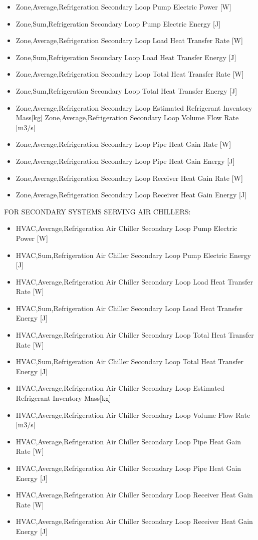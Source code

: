 \begin{itemize}
\item
  Zone,Average,Refrigeration Secondary Loop Pump Electric Power {[}W{]}
\item
  Zone,Sum,Refrigeration Secondary Loop Pump Electric Energy {[}J{]}
\item
  Zone,Average,Refrigeration Secondary Loop Load Heat Transfer Rate {[}W{]}
\item
  Zone,Sum,Refrigeration Secondary Loop Load Heat Transfer Energy {[}J{]}
\item
  Zone,Average,Refrigeration Secondary Loop Total Heat Transfer Rate {[}W{]}
\item
  Zone,Sum,Refrigeration Secondary Loop Total Heat Transfer Energy {[}J{]}
\item
  Zone,Average,Refrigeration Secondary Loop Estimated Refrigerant Inventory Mass{[}kg{]} Zone,Average,Refrigeration Secondary Loop Volume Flow Rate {[}m3/s{]}
\item
  Zone,Average,Refrigeration Secondary Loop Pipe Heat Gain Rate {[}W{]}
\item
  Zone,Average,Refrigeration Secondary Loop Pipe Heat Gain Energy {[}J{]}
\item
  Zone,Average,Refrigeration Secondary Loop Receiver Heat Gain Rate {[}W{]}
\item
  Zone,Average,Refrigeration Secondary Loop Receiver Heat Gain Energy {[}J{]}
\end{itemize}

FOR SECONDARY SYSTEMS SERVING AIR CHILLERS:

\begin{itemize}
\item
  HVAC,Average,Refrigeration Air Chiller Secondary Loop Pump Electric Power {[}W{]}
\item
  HVAC,Sum,Refrigeration Air Chiller Secondary Loop Pump Electric Energy {[}J{]}
\item
  HVAC,Average,Refrigeration Air Chiller Secondary Loop Load Heat Transfer Rate {[}W{]}
\item
  HVAC,Sum,Refrigeration Air Chiller Secondary Loop Load Heat Transfer Energy {[}J{]}
\item
  HVAC,Average,Refrigeration Air Chiller Secondary Loop Total Heat Transfer Rate {[}W{]}
\item
  HVAC,Sum,Refrigeration Air Chiller Secondary Loop Total Heat Transfer Energy {[}J{]}
\item
  HVAC,Average,Refrigeration Air Chiller Secondary Loop Estimated Refrigerant Inventory Mass{[}kg{]}
\item
  HVAC,Average,Refrigeration Air Chiller Secondary Loop Volume Flow Rate {[}m3/s{]}
\item
  HVAC,Average,Refrigeration Air Chiller Secondary Loop Pipe Heat Gain Rate {[}W{]}
\item
  HVAC,Average,Refrigeration Air Chiller Secondary Loop Pipe Heat Gain Energy {[}J{]}
\item
  HVAC,Average,Refrigeration Air Chiller Secondary Loop Receiver Heat Gain Rate {[}W{]}
\item
  HVAC,Average,Refrigeration Air Chiller Secondary Loop Receiver Heat Gain Energy {[}J{]}
\end{itemize}

